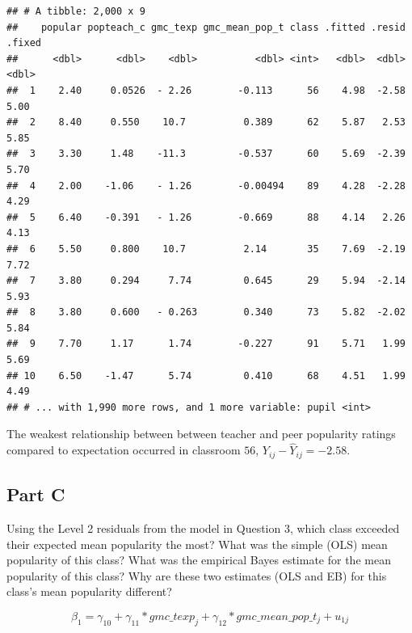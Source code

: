 \documentclass[]{article}
\newenvironment{Shaded}{\begin{snugshade}}{\end{snugshade}}
\newcommand{\CommentTok}[1]{\textcolor[rgb]{0.56,0.35,0.01}{\textit{#1}}}
\begin{document}
\begin{verbatim}
## # A tibble: 2,000 x 9
##    popular popteach_c gmc_texp gmc_mean_pop_t class .fitted .resid .fixed
##      <dbl>      <dbl>    <dbl>          <dbl> <int>   <dbl>  <dbl>  <dbl>
##  1    2.40     0.0526  - 2.26        -0.113      56    4.98  -2.58   5.00
##  2    8.40     0.550    10.7          0.389      62    5.87   2.53   5.85
##  3    3.30     1.48    -11.3         -0.537      60    5.69  -2.39   5.70
##  4    2.00    -1.06    - 1.26        -0.00494    89    4.28  -2.28   4.29
##  5    6.40    -0.391   - 1.26        -0.669      88    4.14   2.26   4.13
##  6    5.50     0.800    10.7          2.14       35    7.69  -2.19   7.72
##  7    3.80     0.294     7.74         0.645      29    5.94  -2.14   5.93
##  8    3.80     0.600   - 0.263        0.340      73    5.82  -2.02   5.84
##  9    7.70     1.17      1.74        -0.227      91    5.71   1.99   5.69
## 10    6.50    -1.47      5.74         0.410      68    4.51   1.99   4.49
## # ... with 1,990 more rows, and 1 more variable: pupil <int>
\end{verbatim}

\begin{Shaded}
\begin{Highlighting}[]
\CommentTok{# %
\end{Highlighting}
\end{Shaded}

The weakest relationship between between teacher and peer popularity
ratings compared to expectation occurred in classroom \(56\),
\(Y_{ij} - \hat{Y}_{ij} = -2.58\).

\subsection{Part C}\label{part-c-3}

Using the Level 2 residuals from the model in Question 3, which class
exceeded their expected mean popularity the most? What was the simple
(OLS) mean popularity of this class? What was the empirical Bayes
estimate for the mean popularity of this class? Why are these two
estimates (OLS and EB) for this class's mean popularity different?

\[\beta_1 = \gamma_{10} + \gamma_{11}*gmc\_texp_j + \gamma_{12}*gmc\_mean\_pop\_t_j + u_{1j}\]
\end{document}
